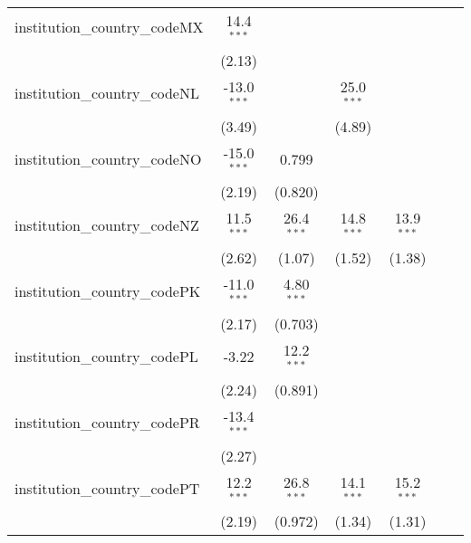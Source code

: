 \begin{tabular}{lcccccc}
   institution\_country\_codeMX          & 14.4$^{***}$  &               &               &               &               &   \\   
                                         & (2.13)        &               &               &               &               &   \\   
   institution\_country\_codeNL          & -13.0$^{***}$ &               & 25.0$^{***}$  &               &               &   \\   
                                         & (3.49)        &               & (4.89)        &               &               &   \\   
   institution\_country\_codeNO          & -15.0$^{***}$ & 0.799         &               &               &               &   \\   
                                         & (2.19)        & (0.820)       &               &               &               &   \\   
   institution\_country\_codeNZ          & 11.5$^{***}$  & 26.4$^{***}$  & 14.8$^{***}$  & 13.9$^{***}$  &               &   \\   
                                         & (2.62)        & (1.07)        & (1.52)        & (1.38)        &               &   \\   
   institution\_country\_codePK          & -11.0$^{***}$ & 4.80$^{***}$  &               &               &               &   \\   
                                         & (2.17)        & (0.703)       &               &               &               &   \\   
   institution\_country\_codePL          & -3.22         & 12.2$^{***}$  &               &               &               &   \\   
                                         & (2.24)        & (0.891)       &               &               &               &   \\   
   institution\_country\_codePR          & -13.4$^{***}$ &               &               &               &               &   \\   
                                         & (2.27)        &               &               &               &               &   \\   
   institution\_country\_codePT          & 12.2$^{***}$  & 26.8$^{***}$  & 14.1$^{***}$  & 15.2$^{***}$  &               &   \\   
                                         & (2.19)        & (0.972)       & (1.34)        & (1.31)        &               &   \\   

\end{tabular}
